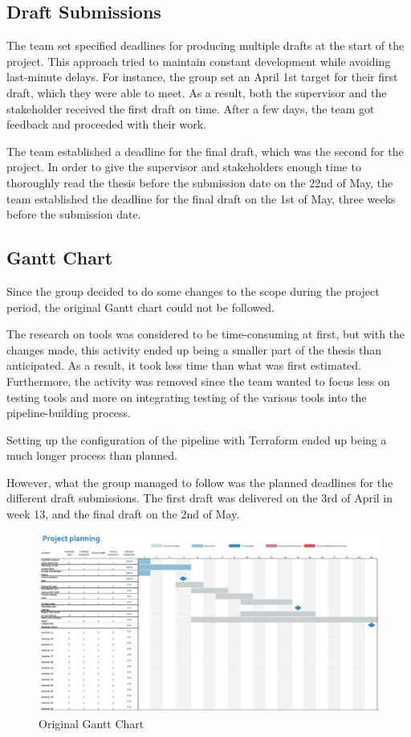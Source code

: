 \subsection{Draft Submissions}
The team set specified deadlines for producing multiple drafts at the start of the project. This approach tried to maintain constant development while avoiding last-minute delays. For instance, the group set an April 1st target for their first draft, which they were able to meet. As a result, both the supervisor and the stakeholder received the first draft on time. After a few days, the team got feedback and proceeded with their work. 

The team established a deadline for the final draft, which was the second for the project. In order to give the supervisor and stakeholders enough time to thoroughly read the thesis before the submission date on the 22nd of May, the team established the deadline for the final draft on the 1st of May, three weeks before the submission date. 


\subsection{Gantt Chart}
Since the group decided to do some changes to the scope during the project period, the original Gantt chart could not be followed. 

The research on tools was considered to be time-consuming at first, but with the changes made, this activity ended up being a smaller part of the thesis than anticipated. As a result, it took less time than what was first estimated. Furthermore, the activity was removed since the team wanted to focus less on testing tools and more on integrating testing of the various tools into the pipeline-building process. 

Setting up the configuration of the pipeline with Terraform ended up being a much longer process than planned. 

However, what the group managed to follow was the planned deadlines for the different draft submissions. The first draft was delivered on the 3rd of April in week 13, and the final draft on the 2nd of May.

\vspace{2mm}
\begin{figure}[H]
    \centering
    \includegraphics[width=0.8\columnwidth]{Images/gantt2.jpg}
    \caption{Original Gantt Chart}
    \label{fig: Original Gantt Chart}
\end{figure}

